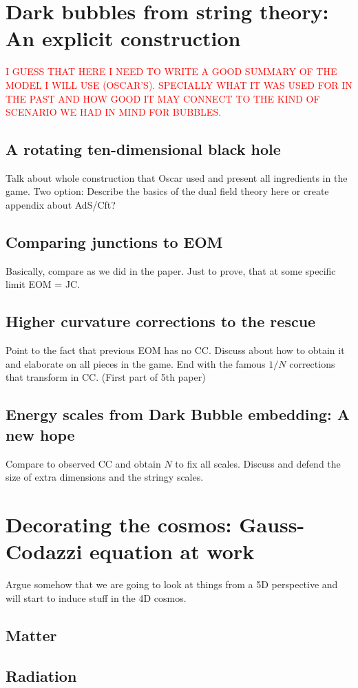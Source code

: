 \documentclass[12pt, a4paper]{article} %
\begin{document}
\section{Dark bubbles from string theory: An explicit construction}\label{sec: db_from_st}
\textcolor{red}{I GUESS THAT HERE I NEED TO WRITE A GOOD SUMMARY OF THE MODEL I WILL USE (OSCAR'S). SPECIALLY WHAT IT WAS USED FOR IN THE PAST AND HOW GOOD IT MAY CONNECT TO THE KIND OF SCENARIO WE HAD IN MIND FOR BUBBLES.}
\subsection{A rotating ten-dimensional black hole}
Talk about whole construction that Oscar used and present all ingredients in the game. Two option: Describe the basics of the dual field theory here or create appendix about AdS/Cft?
\subsection{Comparing junctions to EOM}
Basically, compare as we did in the paper. Just to prove, that at some specific limit EOM = JC. 
\subsection{Higher curvature corrections to the rescue}
Point to the fact that previous EOM has no CC. Discuss about how to obtain it and elaborate on all pieces in the game. End with the famous $1/N$ corrections that transform in CC. (First part of 5th paper)
\subsection{Energy scales from Dark Bubble embedding: A new hope}
Compare to observed CC and obtain $N$ to fix all scales. Discuss and defend the size of extra dimensions and the stringy scales.
\section{Decorating the cosmos: Gauss-Codazzi equation at work}\label{sec: decoration}
Argue somehow that we are going to look at things from a 5D perspective and will start to induce stuff in the 4D cosmos.
\subsection{Matter}
\subsection{Radiation}
\end{document}
